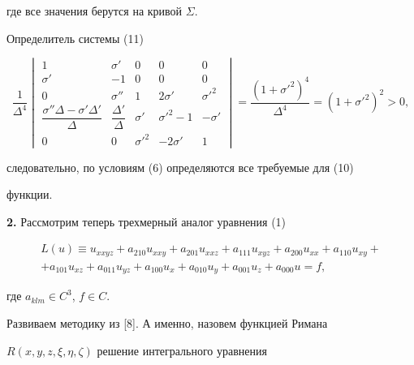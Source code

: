 где все значения берутся на кривой $\Sigma$.


Определитель системы (11)


$$


\frac{1}{\Delta^4}


\begin{vmatrix}


1 & \sigma' & 0 & 0 & 0 \\


\sigma' & -1 & 0 & 0 & 0 \\


0 & \sigma'' & 1 & 2\sigma' & {\sigma'}^2 \\


\dfrac{\sigma''\Delta-\sigma'\Delta'}{\Delta} &


\dfrac{\Delta'}{\Delta} &


\sigma' & {\sigma'}^2 -1 & -\sigma'\\


0 & 0 & {\sigma'}^2 & -2\sigma' & 1


\end{vmatrix}


=\frac{(1+{\sigma'}^2)^4}{\Delta^{4}}=(1+{\sigma'}^2)^2>0,


$$


следовательно, по условиям (6) определяются все требуемые для (10)


функции.


\medskip





{\bf 2.} Рассмотрим теперь трехмерный аналог уравнения (1)


\begin{multline}


L(u)\equiv u_{xxyz}+a_{210}u_{xxy}+a_{201}u_{xxz}+a_{111}u_{xyz}


+a_{200}u_{xx}+a_{110}u_{xy}+\\


+a_{101}u_{xz}+a_{011}u_{yz}+a_{100}u_{x}+a_{010}u_{y}


+a_{001}u_{z}+a_{000}u=f,


\end{multline}


где $a_{klm}\in C^{3}$, $f\in C$.





Развиваем методику из [8]. А именно, назовем функцией Римана


$R(x,y,z,\xi,\eta,\zeta)$ решение интегрального уравнения


